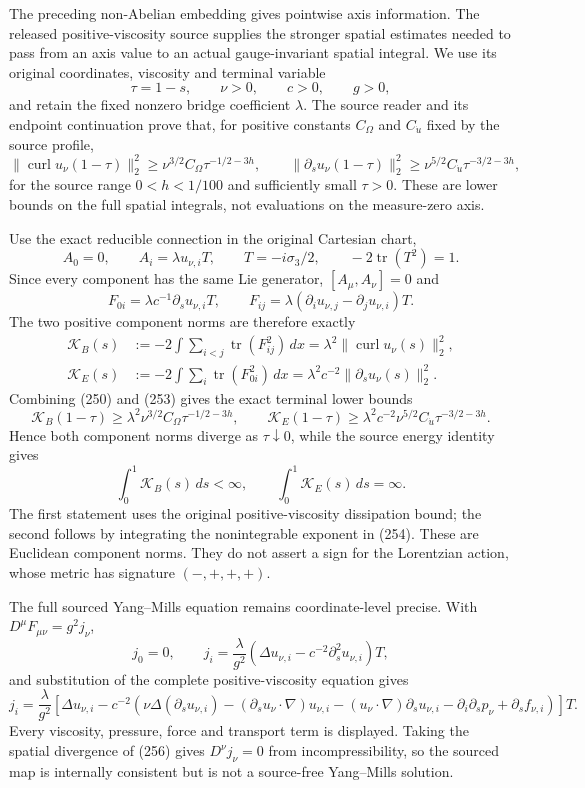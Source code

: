 \documentclass[11pt]{article}
\begin{document}
The preceding non-Abelian embedding gives pointwise axis information.  The released positive-viscosity source supplies the stronger spatial estimates needed to pass from an axis value to an actual gauge-invariant spatial integral.  We use its original coordinates, viscosity and terminal variable
\[
  \tau=1-s,\qquad \nu>0,\qquad c>0,\qquad g>0,
\]
and retain the fixed nonzero bridge coefficient $\lambda$.  The source reader and its endpoint continuation prove that, for positive constants $C_\Omega$ and $C_{\dot u}$ fixed by the source profile,
\[
 \|\operatorname{curl}u_\nu(1-\tau)\|_2^2
 \ge \nu^{3/2}C_\Omega\tau^{-1/2-3h},\qquad
 \|\partial_su_\nu(1-\tau)\|_2^2
 \ge \nu^{5/2}C_{\dot u}\tau^{-3/2-3h},
 \tag{250}
\]
for the source range $0<h<1/100$ and sufficiently small $\tau>0$.  These are lower bounds on the full spatial integrals, not evaluations on the measure-zero axis.

Use the exact reducible connection in the original Cartesian chart,
\[
 A_0=0,\qquad A_i=\lambda u_{\nu,i}T,
 \qquad T=-i\sigma_3/2,
 \qquad -2\operatorname{tr}(T^2)=1.
 \tag{251}
\]
Since every component has the same Lie generator, $[A_\mu,A_\nu]=0$ and
\[
 F_{0i}=\lambda c^{-1}\partial_su_{\nu,i}T,
 \qquad
 F_{ij}=\lambda(\partial_i u_{\nu,j}-\partial_j u_{\nu,i})T.
 \tag{252}
\]
The two positive component norms are therefore exactly
\[
\begin{aligned}
 \mathcal K_B(s)&:=-2\int\sum_{i<j}\operatorname{tr}(F_{ij}^2)\,dx
      =\lambda^2\|\operatorname{curl}u_\nu(s)\|_2^2,\\
 \mathcal K_E(s)&:=-2\int\sum_i\operatorname{tr}(F_{0i}^2)\,dx
      =\lambda^2c^{-2}\|\partial_su_\nu(s)\|_2^2.
\end{aligned}
\tag{253}
\]
Combining (250) and (253) gives the exact terminal lower bounds
\[
 \mathcal K_B(1-\tau)\ge\lambda^2\nu^{3/2}C_\Omega\tau^{-1/2-3h},\qquad
 \mathcal K_E(1-\tau)\ge\lambda^2c^{-2}\nu^{5/2}C_{\dot u}\tau^{-3/2-3h}.
 \tag{254}
\]
Hence both component norms diverge as $\tau\downarrow0$, while the source energy identity gives
\[
 \int_0^1\mathcal K_B(s)\,ds<\infty,
 \qquad
 \int_0^1\mathcal K_E(s)\,ds=\infty.
 \tag{255}
\]
The first statement uses the original positive-viscosity dissipation bound; the second follows by integrating the nonintegrable exponent in (254).  These are Euclidean component norms.  They do not assert a sign for the Lorentzian action, whose metric has signature $(-,+,+,+)$.

The full sourced Yang--Mills equation remains coordinate-level precise.  With $D^\mu F_{\mu\nu}=g^2j_\nu$,
\[
 j_0=0,
 \qquad
 j_i=\frac{\lambda}{g^2}
 \left(\Delta u_{\nu,i}-c^{-2}\partial_s^2u_{\nu,i}\right)T,
 \tag{256}
\]
and substitution of the complete positive-viscosity equation gives
\[
 j_i=\frac{\lambda}{g^2}\left[\Delta u_{\nu,i}
 -c^{-2}\left(\nu\Delta(\partial_su_{\nu,i})
 -(\partial_su_\nu\!\cdot\!\nabla)u_{\nu,i}
 -(u_\nu\!\cdot\!\nabla)\partial_su_{\nu,i}
 -\partial_i\partial_sp_\nu+\partial_sf_{\nu,i}\right)\right]T.
 \tag{257}
\]
Every viscosity, pressure, force and transport term is displayed.  Taking the spatial divergence of (256) gives $D^\nu j_\nu=0$ from incompressibility, so the sourced map is internally consistent but is not a source-free Yang--Mills solution.
\end{document}
